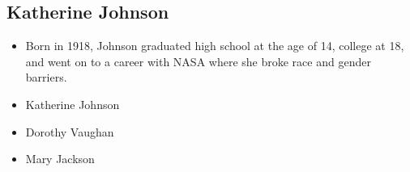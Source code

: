 \documentclass[11pt,a4paper]{article}
\begin{document}
\begin{center}
  \section*{\sc Katherine Johnson}
\end{center}
  \begin{itemize}
    \item Born in 1918, Johnson graduated high school at the age of 14, college at 18, and went on to a career with NASA where she broke race and gender barriers. 
    \item Katherine Johnson
    \item Dorothy Vaughan
    \item Mary Jackson
  \end{itemize}
\end{document}
